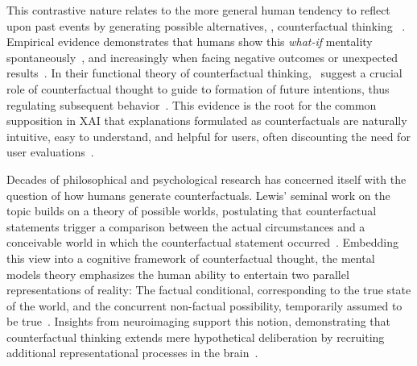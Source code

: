 This contrastive nature relates to the more general human tendency to reflect upon past events by generating possible alternatives, \ie, counterfactual thinking ~\citep{roese_counterfactual_1997}.
Empirical evidence demonstrates that humans show this \textit{what-if} mentality spontaneously~\citep{goldinger_blaming_2003}, and increasingly when facing negative outcomes or unexpected results~\citep{sanna_antecedents_1996}.
In their functional theory of counterfactual thinking,~\citeauthor{roese_functional_2017} suggest a crucial role of counterfactual thought to guide to formation of future intentions, thus regulating subsequent behavior~\citep{roese_functional_2017,epstude_functional_2008}.
This evidence is the root for the common supposition in \gls{XAI} that explanations formulated as counterfactuals are naturally intuitive, easy to understand, and helpful for users, often discounting the need for user evaluations~\citep{stepin_paving_2019, dandl_multi-objective_2020, guidotti_local_2018, artelt_counterfactual_2020, artelt_efficient_2022}.

Decades of philosophical and psychological research has concerned itself with the question of how humans generate counterfactuals. 
Lewis' seminal work on the topic builds on a theory of possible worlds, postulating that counterfactual statements trigger a comparison between the actual circumstances and a conceivable world in which the counterfactual statement occurred~\citep{lewis_counterfactuals_1973}.
Embedding this view into a cognitive framework of counterfactual thought, the mental models theory emphasizes the human ability to entertain two parallel representations of reality: The factual conditional, corresponding to the true state of the world, and the concurrent non-factual possibility, temporarily assumed to be true~\citep{byrne_mental_2002,byrne_precis_2007,johnson-laird_conditionals_2002,walsh_mental_2005}.
Insights from neuroimaging support this notion, demonstrating that counterfactual thinking extends mere hypothetical deliberation by recruiting additional representational processes in the brain~\citep{kulakova_processing_2013}.

